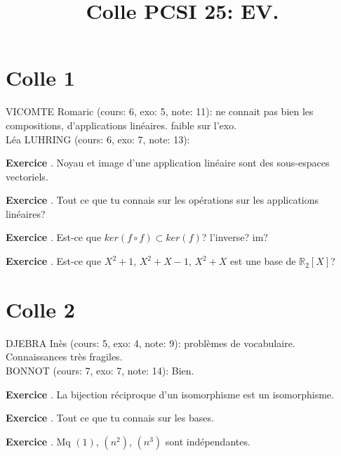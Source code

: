 \documentclass[10pt,a4paper]{article}
\title{Colle PCSI 25: EV.}
\newcounter{question}
\newcounter{exo}
\newenvironment{exo}{\vspace{0.5cm}\setcounter{question}{0}\addtocounter{exo}{1} \noindent \textbf{Exercice \theexo}. \normalsize }{\par}
\begin{document}
	\maketitle
	
	
	\section*{Colle 1}
	\setcounter{exo}{0}
	VICOMTE Romaric (cours: 6, exo: 5, note: 11): ne connait pas bien les compositions, d'applications linéaires. faible sur l'exo.\\
	Léa LUHRING (cours: 6, exo: 7, note: 13):\\
	
	\begin{exo}
		Noyau et image d'une application linéaire sont des sous-espaces vectoriels.
	\end{exo}

	\begin{exo}
		Tout ce que tu connais sur les opérations sur les applications linéaires?
	\end{exo}

	\begin{exo}
		Est-ce que $ker(f \circ f) \subset ker(f)$? l'inverse? im?
	\end{exo}	
	
	\begin{exo}
		Est-ce que $X^2 + 1$, $X^2+ X - 1$, $X^2 + X$ est une base de $\mathbb{R}_2[X]$?
	\end{exo}	
	
	\section*{Colle 2}
	\setcounter{exo}{0}
	DJEBRA Inès (cours: 5, exo: 4, note: 9): problèmes de vocabulaire. Connaissances très fragiles. \\
	BONNOT (cours: 7, exo: 7, note: 14): Bien.\\
	
	\begin{exo}
		 La bijection réciproque d'un isomorphisme est un isomorphisme. 
	\end{exo}		

	\begin{exo}
		Tout ce que tu connais sur les bases.
	\end{exo}

	\begin{exo}
		Mq $(1)$, $(n^2)$, $(n^3)$ sont indépendantes.
	\end{exo}
\end{document}

